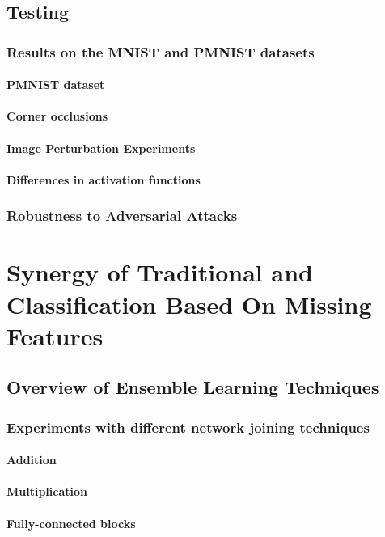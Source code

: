 \documentclass[b5paper]{book}
\begin{document}
\chapter{Testing}

\section{Results on the MNIST and PMNIST datasets}
\subsection{PMNIST dataset}
\subsection{Corner occlusions}
\subsection{Image Perturbation Experiments}
\subsection{Differences in activation functions}
\section{Robustness to Adversarial Attacks}

\part{Synergy of Traditional and Classification Based On Missing Features}

\chapter{Overview of Ensemble Learning Techniques}
\section{Experiments with different network joining techniques}
\subsection{Addition}
\subsection{Multiplication}
\subsection{Fully-connected blocks}
\end{document}
